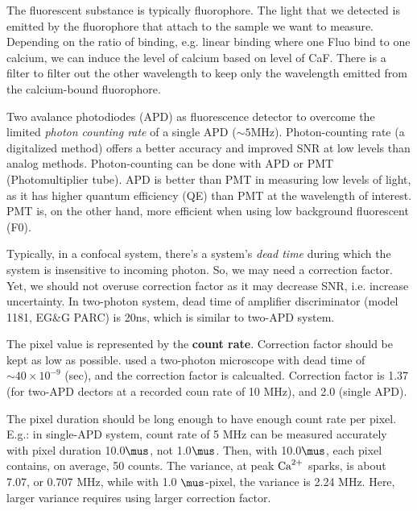 
The fluorescent substance is typically fluorophore. The light that we detected
is emitted by the fluorophore that attach to the sample we want to measure.
Depending on the ratio of binding, e.g. linear binding where one Fluo bind to
one calcium, we can induce the level of calcium based on level of CaF. There is
a filter to filter out the other wavelength to keep only the wavelength emitted
from the calcium-bound fluorophore.

Two avalance photodiodes (APD) as fluorescence detector to overcome the limited
{\it photon counting rate} of a single APD ($\sim 5$MHz). Photon-counting rate
(a digitalized method) offers a better accuracy and improved SNR at low levels
than analog methods. Photon-counting can be done with APD or PMT
(Photomultiplier tube). APD is better than PMT in measuring low levels of light,
as it has higher quantum efficiency (QE) than PMT at the wavelength of interest.
PMT is, on the other hand, more efficient when using low background fluorescent
(F0). 

Typically, in a confocal system, there's a system's {\it dead time} during
which the system is insensitive to incoming photon. So, we may need a correction
factor. Yet, we should not overuse correction factor as it may decrease SNR,
i.e. increase uncertainty. In two-photon system, dead time of amplifier
discriminator (model 1181, EG\&G PARC) is 20ns, which is similar to two-APD
system. 

\begin{framed}
The pixel value is represented by the {\bf count rate}.
Correction factor should be kept as low as possible. \citep{wier2000} used a
two-photon microscope with dead time of $\sim 40\times 10^{-9}$ (sec), and the
correction factor is calcualted. Correction factor is 1.37 (for two-APD
dectors at a recorded coun rate of 10 MHz), and 2.0 (single APD).

The pixel duration should be long enough to have enough count rate per pixel.
E.g.: in single-APD system, count rate of 5 MHz can be measured accurately
with pixel duration 10.0$\mus$, not 1.0$\mus$. Then, with 10.0$\mus$, each pixel
contains, on average, 50 counts. The variance, at peak ${\text{Ca}^{2+}}$ sparks, is about
7.07, or 0.707 MHz, while with 1.0 $\mus$-pixel, the variance is 2.24 MHz. Here,
larger variance requires using larger correction factor. 

\end{framed}


